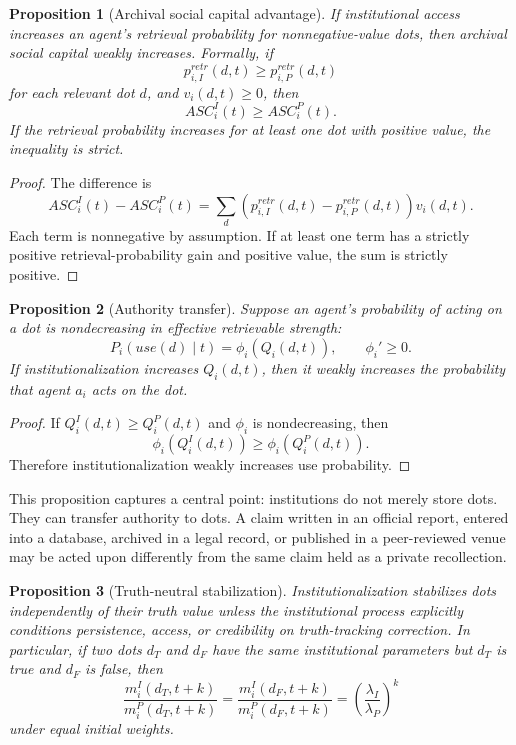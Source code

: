 \documentclass[11pt]{article}
\newtheorem{proposition}{Proposition}
\theoremstyle{remark}
\begin{document}
\begin{proposition}[Archival social capital advantage]\label{prop:archival-social-capital-advantage}
If institutional access increases an agent's retrieval probability for
nonnegative-value dots, then archival social capital weakly increases.
Formally, if
$$
p_{i,I}^{retr}(d,t)\geq p_{i,P}^{retr}(d,t)
$$
for each relevant dot $d$, and $v_i(d,t)\geq0$, then
$$
ASC_i^I(t)\geq ASC_i^P(t).
$$
If the retrieval probability increases for at least one dot with
positive value, the inequality is strict.
\end{proposition}

\begin{proof}
The difference is
$$
ASC_i^I(t)-ASC_i^P(t)
=
\sum_{d}\left(p_{i,I}^{retr}(d,t)-p_{i,P}^{retr}(d,t)\right)v_i(d,t).
$$
Each term is nonnegative by assumption. If at least one term has a
strictly positive retrieval-probability gain and positive value, the sum
is strictly positive.
\end{proof}

\begin{proposition}[Authority transfer]\label{prop:authority-transfer}
Suppose an agent's probability of acting on a dot is nondecreasing in
effective retrievable strength:
$$
P_i(use(d)\mid t)=\phi_i(Q_i(d,t)), \qquad \phi_i'\geq0.
$$
If institutionalization increases $Q_i(d,t)$, then it weakly increases
the probability that agent $a_i$ acts on the dot.
\end{proposition}

\begin{proof}
If $Q_i^I(d,t)\geq Q_i^P(d,t)$ and $\phi_i$ is nondecreasing, then
$$
\phi_i(Q_i^I(d,t))\geq \phi_i(Q_i^P(d,t)).
$$
Therefore institutionalization weakly increases use probability.
\end{proof}

This proposition captures a central point: institutions do not merely
store dots. They can transfer authority to dots. A claim written in an
official report, entered into a database, archived in a legal record, or
published in a peer-reviewed venue may be acted upon differently from
the same claim held as a private recollection.

\begin{proposition}[Truth-neutral stabilization]\label{prop:truth-neutral-stabilization}
Institutionalization stabilizes dots independently of their truth value
unless the institutional process explicitly conditions persistence,
access, or credibility on truth-tracking correction. In particular, if
two dots $d_T$ and $d_F$ have the same institutional parameters but
$d_T$ is true and $d_F$ is false, then
$$
\frac{m_i^I(d_T,t+k)}{m_i^P(d_T,t+k)}
=
\frac{m_i^I(d_F,t+k)}{m_i^P(d_F,t+k)}
=
\left(\frac{\lambda_I}{\lambda_P}\right)^k
$$
under equal initial weights.
\end{proposition}
\end{document}

